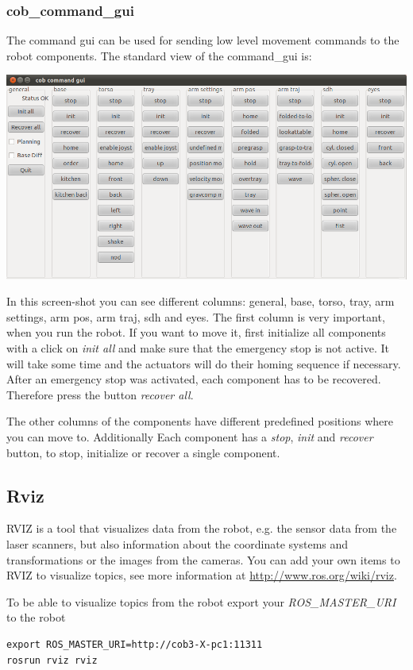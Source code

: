 \subsubsection{cob\_command\_gui}
The command gui can be used for sending low level movement commands to the robot components. The standard view of the command\_gui is:
\begin{center}
 \includegraphics[width=1\textwidth]{images/cob_command_gui.png}
\end{center}

In this screen-shot you can see different columns: general, base, torso, tray, arm settings, arm pos, arm traj, sdh and eyes. The first column is very important, when you run the robot. If you want to move it, first initialize all components with a click on \textit{init all} and make sure that the emergency stop is not active. It will take some time and the actuators will do their homing sequence if necessary. After an emergency stop was activated, each component has to be recovered. Therefore press the button \textit{recover all}. 

The other columns of the components have different predefined positions where you can move to. Additionally Each component has a \textit{stop}, \textit{init} and \textit{recover} button, to stop, initialize or recover a single component.

\subsection{Rviz}
RVIZ is a tool that visualizes data from the robot, e.g. the sensor data from the laser scanners, but also information about the coordinate systems and transformations or the images from the cameras. You can add your own items to RVIZ to visualize topics, see more information at \url{http://www.ros.org/wiki/rviz}.

To be able to visualize topics from the robot export your \textit{ROS\_MASTER\_URI} to the robot
\begin{lstlisting}
export ROS_MASTER_URI=http://cob3-X-pc1:11311
rosrun rviz rviz
\end{lstlisting}

